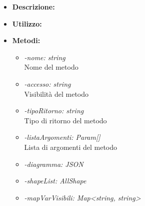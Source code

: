 \begin{itemize}
	\item \textbf{Descrizione:}\\
	
	\item \textbf{Utilizzo:}\\
	
	\item \textbf{Metodi:}
		\begin{itemize}
			\item \emph{-nome: string}\\
    		Nome del metodo
    		\item \emph{-accesso: string}\\
    		Visibilità del metodo
    		\item \emph{-tipoRitorno: string}\\
    		Tipo di ritorno del metodo
    		\item \emph{-listaArgomenti: Param[]}\\
    		Lista di argomenti del metodo
    		\item \emph{-diagramma: JSON}\\
    		
    		\item \emph{-shapeList: AllShape}\\
    		
    		\item \emph{-mapVarVisibili: Map<string, string>}\\
    		

\end{itemize}
\end{itemize}
